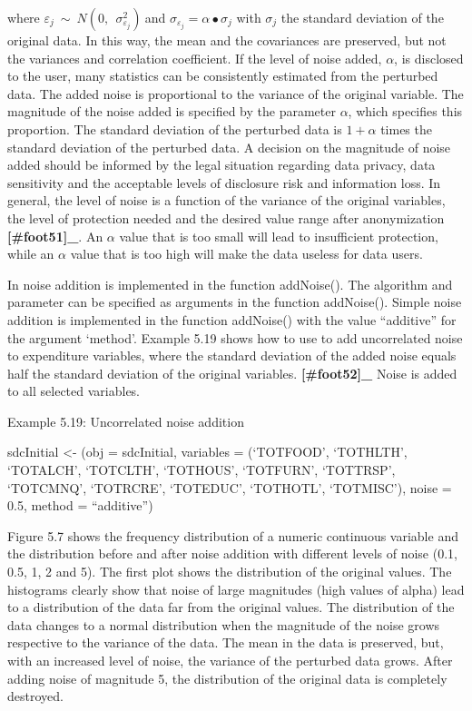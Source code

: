 \documentclass[letterpaper,10pt,english]{sphinxmanual}
\begin{document}
where
\(\varepsilon_{j}\ \sim\ N(0,\ \ \sigma_{\varepsilon_{j}}^{2})\ \)and
\(\sigma_{\varepsilon_{j}} = \alpha \bullet \sigma_{j}\) with
\(\sigma_{j}\) the standard deviation of the original data. In this
way, the mean and the covariances are preserved, but not the variances
and correlation coefficient. If the level of noise added,
\(\alpha\), is disclosed to the user, many statistics can be
consistently estimated from the perturbed data. The added noise is
proportional to the variance of the original variable. The magnitude of
the noise added is specified by the parameter \(\alpha\), which
specifies this proportion. The standard deviation of the perturbed data
is \(1 + \alpha\) times the standard deviation of the perturbed
data. A decision on the magnitude of noise added should be informed by
the legal situation regarding data privacy, data sensitivity and the
acceptable levels of disclosure risk and information loss. In general,
the level of noise is a function of the variance of the original
variables, the level of protection needed and the desired value range
after anonymization {\color{red}\bfseries{}{[}\#foot51{]}\_}. An \(\alpha\) value that
is too small will lead to insufficient protection, while an
\(\alpha\) value that is too high will make the data useless for
data users.

In  noise addition is implemented in the function addNoise().
The algorithm and parameter can be specified as arguments in the
function addNoise(). Simple noise addition is implemented in the
function addNoise() with the value “additive” for the argument ‘method’.
Example 5.19 shows how to use  to add uncorrelated noise to
expenditure variables, where the standard deviation of the added noise
equals half the standard deviation of the original
variables. {\color{red}\bfseries{}{[}\#foot52{]}\_} Noise is added to all selected
variables.

Example 5.19: Uncorrelated noise addition

sdcInitial \textless{}- (obj = sdcInitial, variables =
(‘TOTFOOD’, ‘TOTHLTH’, ‘TOTALCH’, ‘TOTCLTH’, ‘TOTHOUS’,
‘TOTFURN’, ‘TOTTRSP’, ‘TOTCMNQ’, ‘TOTRCRE’, ‘TOTEDUC’, ‘TOTHOTL’,
‘TOTMISC’), noise = 0.5, method = “additive”)

Figure 5.7 shows the frequency distribution of a numeric continuous
variable and the distribution before and after noise addition with
different levels of noise (0.1, 0.5, 1, 2 and 5). The first plot shows
the distribution of the original values. The histograms clearly show
that noise of large magnitudes (high values of alpha) lead to a
distribution of the data far from the original values. The distribution
of the data changes to a normal distribution when the magnitude of the
noise grows respective to the variance of the data. The mean in the data
is preserved, but, with an increased level of noise, the variance of the
perturbed data grows. After adding noise of magnitude 5, the
distribution of the original data is completely destroyed.
\end{document}
